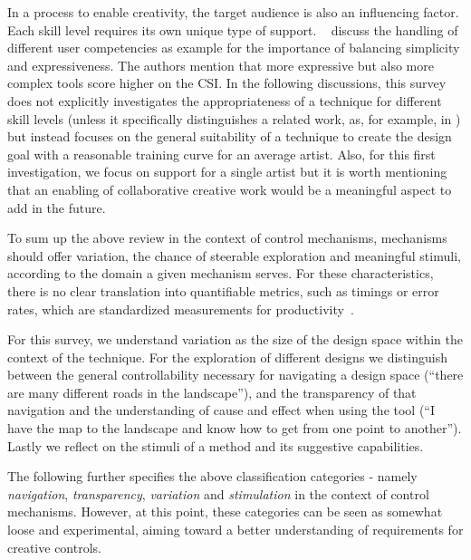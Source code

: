 In a process to enable creativity, the target audience is also an influencing factor. Each skill level requires its own unique type of support. \citeauthor*{cherry_2014_qcs}~\cite{cherry_2014_qcs} discuss the handling of different user competencies as example for the importance of balancing simplicity and expressiveness. The authors mention that more expressive but also more complex tools score higher on the CSI. In the following discussions, this survey does not explicitly investigates the appropriateness of a technique for different skill levels (unless it specifically distinguishes a related work, as, for example, in \cite{benedetti_2014_pba}) but instead focuses on the general suitability of a technique to create the design goal with a reasonable training curve for an average artist. Also, for this first investigation, we focus on support for a single artist but it is worth mentioning that an enabling of collaborative creative work would be a meaningful aspect to add in the future.


To sum up the above review in the context of control mechanisms, mechanisms should offer variation, the chance of steerable exploration and meaningful stimuli, according to the domain a given mechanism serves. For these characteristics, there is no clear translation into quantifiable metrics, such as timings or error rates, which are standardized measurements for productivity~\cite{cherry_2014_qcs,shneiderman_2007_cst}.

For this survey, we understand variation as the size of the design space within the context of the technique. For the exploration of different designs we distinguish between the general controllability necessary for navigating a design space (``there are many different roads in the landscape''), and the transparency of that navigation and the understanding of cause and effect when using the tool (``I have the map to the landscape and know how to get from one point to another''). Lastly we reflect on the stimuli of a method and its suggestive capabilities. 

The following further specifies the above classification categories - namely \textit{navigation}, \textit{transparency}, \textit{variation} and \textit{stimulation} in the context of control mechanisms. However, at this point, these categories can be seen as somewhat loose and experimental, aiming toward a better understanding of requirements for creative controls.

